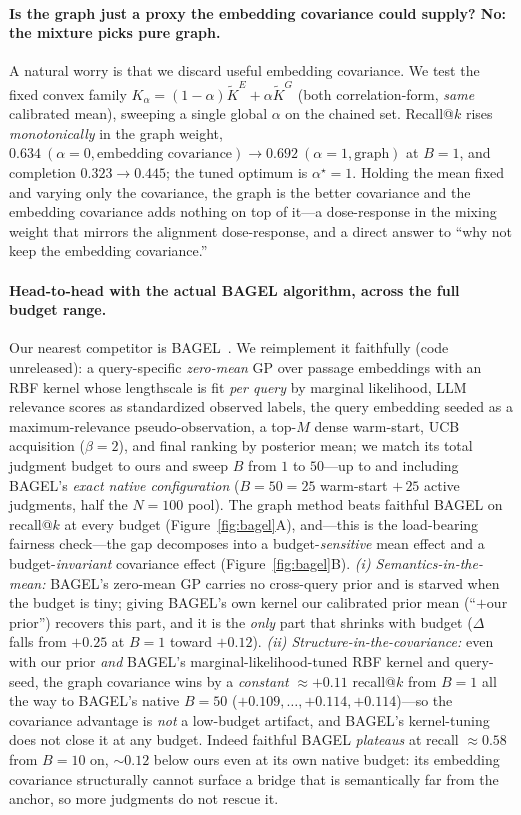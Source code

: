 \documentclass[11pt]{article}
\theoremstyle{plain}\newtheorem{theorem}{Theorem}\newtheorem{lemma}{Lemma}\newtheorem{proposition}{Proposition}
\theoremstyle{definition}\newtheorem{assumption}{Assumption}\newtheorem{remark}{Remark}
\begin{document}
\paragraph{Is the graph just a proxy the embedding covariance could supply? No: the mixture picks pure graph.}
A natural worry is that we discard useful embedding covariance. We test the fixed convex family
$K_\alpha=(1-\alpha)\widetilde K^E+\alpha\widetilde K^G$ (both correlation-form, \emph{same} calibrated mean),
sweeping a single global $\alpha$ on the chained set. Recall@$k$ rises \emph{monotonically} in the graph weight,
$0.634\ (\alpha{=}0,\text{embedding covariance})\to0.692\ (\alpha{=}1,\text{graph})$ at $B{=}1$, and completion
$0.323\to0.445$; the tuned optimum is $\alpha^\star=1$. Holding the mean fixed and varying only the covariance, the
graph is the better covariance and the embedding covariance adds nothing on top of it---a dose-response in the
mixing weight that mirrors the alignment dose-response, and a direct answer to ``why not keep the embedding
covariance.''

\paragraph{Head-to-head with the actual BAGEL algorithm, across the full budget range.} Our nearest competitor is
BAGEL~\citep{bagel2026}. We reimplement it faithfully (code unreleased): a query-specific \emph{zero-mean} GP over
passage embeddings with an RBF kernel whose lengthscale is fit \emph{per query} by marginal likelihood, LLM
relevance scores as standardized observed labels, the query embedding seeded as a maximum-relevance
pseudo-observation, a top-$M$ dense warm-start, UCB acquisition ($\beta{=}2$), and final ranking by posterior mean;
we match its total judgment budget to ours and sweep $B$ from $1$ to $50$---up to and including BAGEL's \emph{exact
native configuration} ($B{=}50=25$ warm-start $+\,25$ active judgments, half the $N{=}100$ pool). The graph method
beats faithful BAGEL on recall@$k$ at every budget (Figure~\ref{fig:bagel}A), and---this is the load-bearing
fairness check---the gap decomposes into a budget-\emph{sensitive} mean effect and a budget-\emph{invariant}
covariance effect (Figure~\ref{fig:bagel}B). \emph{(i) Semantics-in-the-mean:} BAGEL's zero-mean GP carries no
cross-query prior and is starved when the budget is tiny; giving BAGEL's own kernel our calibrated prior mean
(``$+$our prior'') recovers this part, and it is the \emph{only} part that shrinks with budget ($\Delta$ falls from
$+0.25$ at $B{=}1$ toward $+0.12$). \emph{(ii) Structure-in-the-covariance:} even with our prior \emph{and} BAGEL's
marginal-likelihood-tuned RBF kernel and query-seed, the graph covariance wins by a \emph{constant} $\approx +0.11$
recall@$k$ from $B{=}1$ all the way to BAGEL's native $B{=}50$ ($+0.109,\dots,+0.114,+0.114$)---so the covariance
advantage is \emph{not} a low-budget artifact, and BAGEL's kernel-tuning does not close it at any budget. Indeed
faithful BAGEL \emph{plateaus} at recall $\approx 0.58$ from $B{=}10$ on, $\sim0.12$ below ours even at its own
native budget: its embedding covariance structurally cannot surface a bridge that is semantically far from the
anchor, so more judgments do not rescue it.
\end{document}
